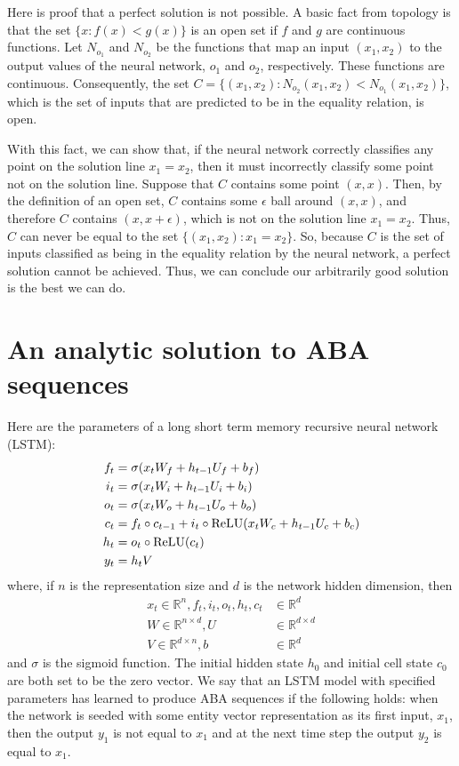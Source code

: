 Here is proof that a perfect solution is not possible. A basic fact from topology is that the set $\{x: f(x) < g(x)\}$ is an open set if $f$ and $g$ are continuous functions. Let $N_{o_1}$ and $N_{o_2}$ be the functions that map an input $(x_1,x_2)$ to the output values of the neural network, $o_1$ and $o_2$, respectively. These functions are continuous. Consequently, the set $C = \{(x_1,x_2): N_{o_2}(x_1,x_2) < N_{o_1}(x_1,x_2)\}$, which is the set of inputs that are predicted to be in the equality relation, is open.

With this fact, we can show that, if the neural network correctly classifies any point on the solution line $x_1 = x_2$, then it must incorrectly classify some point not on the solution line. Suppose that $C$ contains some point $(x,x)$. Then, by the definition of an open set, $C$ contains some $\epsilon$ ball around $(x,x)$, and therefore $C$ contains $(x,x+\epsilon)$, which is not on the solution line $x_1=x_2$. Thus, $C$ can never be equal to the set $\{(x_1,x_2):x_1=x_2\}$. So, because $C$ is the set of inputs classified as being in the equality relation by the neural network, a perfect solution cannot be achieved. Thus, we can conclude our arbitrarily good solution is the best we can do.


\section{An analytic solution to ABA sequences}\label{sec:analyticlm}


Here are the parameters of a long short term memory recursive neural network (LSTM):
%
\begin{align*}
  f_t &= \sigma(x_t W_f  + h_{t-1} U_f  + b_f) \\
  i_t &= \sigma(x_t W_i  + h_{t-1} U_i + b_i) \\
  o_t &= \sigma(x_t W_o +  h_{t-1} U_o + b_o)\\
  c_t &= f_t \circ c_{t-1} + i_t \circ \operatorname{ReLU}(x_tW_c + h_{t-1}U_c + b_c) \\
  h_t &= o_t \circ \operatorname{ReLU}(c_t) \\
  y_t &= h_tV
\end{align*}
%
where, if $n$ is the representation size and $d$ is the network hidden dimension, then
%
\begin{align*}
  x_t \in \mathbb{R}^n, f_t, i_t, o_t,  h_t, c_t &\in \mathbb{R}^d\\
  W \in \mathbb{R}^{n \times d}, U &\in \mathbb{R}^{d \times d}\\
  V \in \mathbb{R}^{d \times n}, b &\in \mathbb{R}^d
\end{align*}
%
and $\sigma$ is the sigmoid function. The initial hidden state $h_0$ and initial cell state $c_0$ are both set to be the zero vector. We say that an LSTM model with specified parameters has learned to produce ABA sequences if the following holds: when the network is seeded with some entity vector representation as its first input, $x_1$, then the output $y_1$ is not equal to $x_1$ and at the next time step the output $y_2$ is equal to $x_1$.

